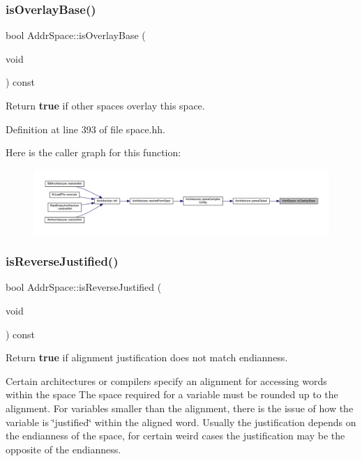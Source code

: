 \subsubsection{\texorpdfstring{isOverlayBase()}{isOverlayBase()}}
{\footnotesize\ttfamily bool Addr\+Space\+::is\+Overlay\+Base (\begin{DoxyParamCaption}\item[{void}]{ }\end{DoxyParamCaption}) const\hspace{0.3cm}{\ttfamily [inline]}}



Return {\bfseries{true}} if other spaces overlay this space. 



Definition at line 393 of file space.\+hh.

Here is the caller graph for this function\+:
\nopagebreak
\begin{figure}[H]
\begin{center}
\leavevmode
\includegraphics[width=350pt]{class_addr_space_a66dc51ca0c5b8f2061cbbec7446e71fc_icgraph}
\end{center}
\end{figure}
\mbox{\label{class_addr_space_aea27d2d0e9b150a4f884fb029eaefbf6}} 
\subsubsection{\texorpdfstring{isReverseJustified()}{isReverseJustified()}}
{\footnotesize\ttfamily bool Addr\+Space\+::is\+Reverse\+Justified (\begin{DoxyParamCaption}\item[{void}]{ }\end{DoxyParamCaption}) const\hspace{0.3cm}{\ttfamily [inline]}}



Return {\bfseries{true}} if alignment justification does not match endianness. 

Certain architectures or compilers specify an alignment for accessing words within the space The space required for a variable must be rounded up to the alignment. For variables smaller than the alignment, there is the issue of how the variable is \char`\"{}justified\char`\"{} within the aligned word. Usually the justification depends on the endianness of the space, for certain weird cases the justification may be the opposite of the endianness. 

